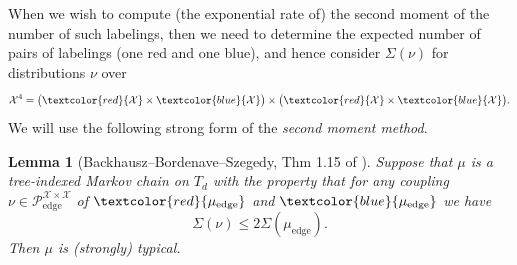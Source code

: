 \documentclass[12pt]{amsart}
\newtheorem{lemma}[theorem]{Lemma}
\theoremstyle{definition}
\newcommand\Pcedge{\mathcal{P}_\mathrm{edge}}
\newcommand\Xc{\mathcal{X}}
\newcommand\muedge{\mu_\mathrm{edge}}
\begin{document}
When we wish to compute (the exponential rate of) the second moment of the number of such labelings, then we need to determine the expected number of pairs of labelings (one red and one blue), and hence consider $\Sigma(\nu)$ for distributions $\nu$ over
%
\[ \Xc^4 = 
\big( \textcolor{red}{\Xc} \times 
\textcolor{blue}{\Xc} \big) \times 
\big( \textcolor{red}{\Xc} \times 
\textcolor{blue}{\Xc}\big) .\] 
%
We will use the following strong form of the \emph{second moment method}.
%
\begin{lemma}[Backhausz--Bordenave--Szegedy, Thm 1.15 of \cite{backhausz2022typicality}] \label{lem:boosted_smm}
Suppose that $\mu$ is a tree-indexed Markov chain on $T_d$ with the property that for any coupling $\nu \in \Pcedge^{\Xc \times \Xc}$ of $\textcolor{red}{\muedge}$ and $\textcolor{blue}{\muedge}$ we have 
%
\begin{equation} \label{eq:sm_condition}
\Sigma(\nu) \leq 2 \Sigma(\muedge) .
\end{equation}
%
Then $\mu$ is (strongly) typical.
\end{lemma}
%
\end{document}

